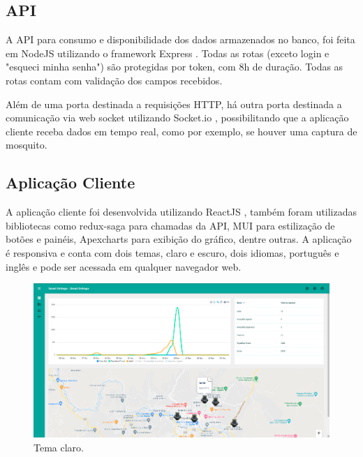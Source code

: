 \documentclass[
	12pt,				%
	openright,			%
	oneside,			%
	a4paper,			%
	chapter=TITLE,		%
	english,			%
	brazil				%
	]{abntex2}
\begin{document}
\subsection{API}

A API para consumo e disponibilidade dos dados armazenados no banco, foi feita em NodeJS \cite{NodeJS} utilizando o framework Express \cite{Express}. Todas as rotas (exceto login e 
"esqueci minha senha") são protegidas por token, com 8h de duração. Todas as rotas contam com validação dos campos recebidos. 

Além de uma porta destinada a requisições HTTP, há outra porta destinada a comunicação via web socket utilizando Socket.io \cite{SocketIo}, possibilitando que a aplicação cliente 
receba dados em tempo real, como por exemplo, se houver uma captura de mosquito.

\subsection{Aplicação Cliente}

A aplicação cliente foi desenvolvida utilizando ReactJS \cite{React}, também foram utilizadas bibliotecas como redux-saga \cite{ReduxSaga} para chamadas da API, MUI \cite{MUI} para estilização 
de botões e painéis, Apexcharts \cite{ApexCharts} para exibição do gráfico, dentre outras. A aplicação é responsiva e
conta com dois temas, claro e escuro, dois idiomas, português e inglês e pode ser acessada em qualquer navegador web. 

\begin{figure}[H]
\centering
\includegraphics[scale=0.20]{imagens/front_1.png}
\caption{Tema claro.}
    \label{fig:light}
\end{figure}
\end{document}
